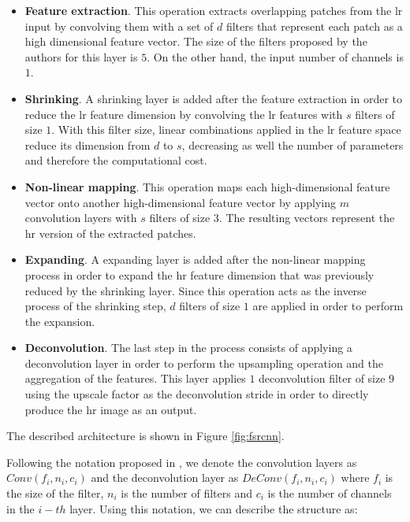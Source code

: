 \begin{itemize}
	\item \textbf{Feature extraction}. This operation extracts overlapping patches from the \gls{lr} input by convolving them with a set of $d$ filters that represent each patch as a high dimensional feature vector. The size of the filters proposed by the authors for this layer is $5$. On the other hand, the input number of channels is $1$.
	
	\item \textbf{Shrinking}. A shrinking layer is added after the feature extraction in order to reduce the \gls{lr} feature dimension by convolving the \gls{lr} features with $s$ filters of size $1$. With this filter size, linear combinations applied in the  \gls{lr} feature space reduce its dimension from $d$ to $s$, decreasing as well the number of parameters and therefore the computational cost.
	
	\item \textbf{Non-linear mapping}. This operation maps each high-dimensional feature vector onto another high-dimensional feature vector by applying $m$ convolution layers with $s$ filters of size $3$. The resulting vectors represent the \gls{hr} version of the extracted patches.
	
	\item \textbf{Expanding}. A expanding layer is added after the non-linear mapping process in order to expand the \gls{hr} feature dimension that was previously reduced by the shrinking layer. Since this operation acts as the inverse process of the shrinking step, $d$ filters of size $1$ are applied in order to perform the expansion.
	
	\item \textbf{Deconvolution}. The last step in the process consists of applying a deconvolution layer in order to perform the upsampling operation and the aggregation of the features. This layer applies $1$ deconvolution filter of size $9$ using the upscale factor as the deconvolution stride in order to directly produce the \gls{hr} image as an output.
\end{itemize}

The described architecture is shown in Figure \ref{fig:fsrcnn}.

Following the notation proposed in \cite{FSRCNN}, we denote the convolution layers as $Conv(f_i, n_i, c_i)$ and the deconvolution layer as $DeConv(f_i, n_i, c_i)$ where $f_i$ is the size of the filter, $n_i$ is the number of filters and $c_i$ is the number of channels in the $i-th$ layer. Using this notation, we can describe the structure as:

